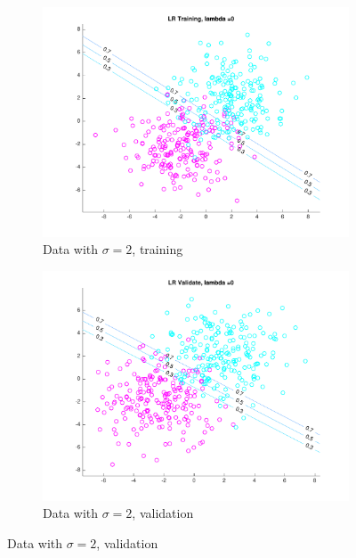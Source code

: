 \begin{figure}[h!]
    \begin{subfigure}[b]{0.4\textwidth}
	\includegraphics[scale=0.4]{hw2_1_stdev2_a_0.pdf}
	\caption{Data with $\sigma = 2$, training}\label{fig:data_stdev2a}
	\end{subfigure}
	\quad	
	\begin{subfigure}[b]{0.4\textwidth}
	\includegraphics[scale=0.4]{hw2_1_stdev2_b_0.pdf}
	\caption{Data with $\sigma = 2$, validation}\label{fig:data_stdev2b}
	\end{subfigure}
    

\end{figure}
